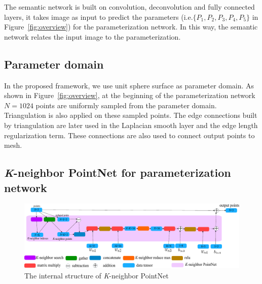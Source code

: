 The semantic network is built on convolution, deconvolution and fully connected layers, it takes image as input to predict the parameters (i.e.$\{P_1,P_2,P_3,P_4,P_5\}$ in Figure~\ref{fig:overview}) for the parameterization network. In this way, the semantic network relates the input image to the parameterization.
\subsection{Parameter domain}
In the proposed framework, we use unit sphere surface as parameter domain. As shown in Figure~\ref{fig:overview}, at the beginning of the parameterization network $N=1024$ points are uniformly sampled from the parameter domain. Triangulation is also applied on these sampled points. The edge connections built by triangulation are later used in the Laplacian smooth layer and the edge length regularization term. These connections are also used to connect output points to mesh.
\subsection{\textit{K}-neighbor PointNet for parameterization network} 
\label{subsec:k-n_point_net}

\begin{figure}[htbp]
	\centering
	\includegraphics[width=\linewidth]{img/net/k-n_pointnet}
	\caption{The internal structure of \textit{K}-neighbor PointNet}
	\label{fig:knpointnet}
\end{figure}

